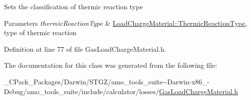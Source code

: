 Sets the classification of thermic reaction type 
\begin{DoxyParams}{Parameters}
{\em thermic\+Reaction\+Type} & \hyperlink{namespace_load_charge_material_a51d4263e865a5d86236622dd3fe23fd1}{Load\+Charge\+Material\+::\+Thermic\+Reaction\+Type}, type of thermic reaction \\
\hline
\end{DoxyParams}


Definition at line 77 of file Gas\+Load\+Charge\+Material.\+h.



The documentation for this class was generated from the following file\+:\begin{DoxyCompactItemize}
\item 
\+\_\+\+C\+Pack\+\_\+\+Packages/\+Darwin/\+S\+T\+G\+Z/amo\+\_\+tools\+\_\+suite-\/-\/\+Darwin-\/x86\+\_-\/\+Debug/amo\+\_\+tools\+\_\+suite/include/calculator/losses/\hyperlink{___c_pack___packages_2_darwin_2_s_t_g_z_2amo__tools__suite--_darwin-x86__64-_debug_2amo__tools__7b3e8803f2c44210b504e0a3079e71d1}{Gas\+Load\+Charge\+Material.\+h}\end{DoxyCompactItemize}
